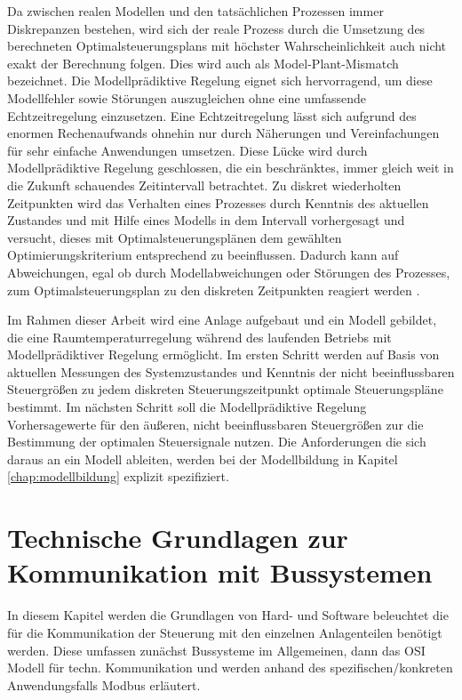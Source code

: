 Da zwischen realen Modellen und den tatsächlichen Prozessen immer Diskrepanzen bestehen, wird sich der reale Prozess durch die Umsetzung des berechneten Optimalsteuerungsplans mit höchster Wahrscheinlichkeit auch nicht exakt der Berechnung folgen. Dies wird auch als Model-Plant-Mismatch bezeichnet. Die Modellprädiktive Regelung eignet sich hervorragend, um diese Modellfehler sowie Störungen auszugleichen ohne eine umfassende Echtzeitregelung einzusetzen. Eine Echtzeitregelung lässt sich aufgrund des enormen Rechenaufwands ohnehin nur durch Näherungen und Vereinfachungen für sehr einfache Anwendungen umsetzen. Diese Lücke wird durch Modellprädiktive Regelung geschlossen, die ein beschränktes, immer gleich weit in die Zukunft schauendes Zeitintervall betrachtet. Zu diskret wiederholten Zeitpunkten wird das Verhalten eines Prozesses durch Kenntnis des aktuellen Zustandes und mit Hilfe eines Modells in dem Intervall vorhergesagt und versucht, dieses mit Optimalsteuerungsplänen dem gewählten Optimierungskriterium entsprechend zu beeinflussen. Dadurch kann auf Abweichungen, egal ob durch Modellabweichungen oder Störungen des Prozesses, zum Optimalsteuerungsplan zu den diskreten Zeitpunkten reagiert werden \cite[S.~71]{di14}.

Im Rahmen dieser Arbeit wird eine Anlage aufgebaut und ein Modell gebildet, die eine Raumtemperaturregelung während des laufenden Betriebs mit Modellprädiktiver Regelung ermöglicht. Im ersten Schritt werden auf Basis von aktuellen Messungen des Systemzustandes und Kenntnis der nicht beeinflussbaren Steuergrößen zu jedem diskreten Steuerungszeitpunkt optimale Steuerungspläne bestimmt. Im nächsten Schritt soll die Modellprädiktive Regelung Vorhersagewerte für den äußeren, nicht beeinflussbaren Steuergrößen zur die Bestimmung der optimalen Steuersignale nutzen.
Die Anforderungen die sich daraus an ein Modell ableiten, werden bei der Modellbildung in Kapitel \ref{chap:modellbildung} explizit spezifiziert.

\section{Technische Grundlagen zur Kommunikation mit Bussystemen}
\label{sec:grundlagenbus}
In diesem Kapitel werden die Grundlagen von Hard- und Software beleuchtet die für die Kommunikation der Steuerung mit den einzelnen Anlagenteilen benötigt werden.
Diese umfassen zunächst Bussysteme im Allgemeinen, dann das OSI Modell für techn. Kommunikation und werden anhand des spezifischen/konkreten Anwendungsfalls Modbus erläutert.

